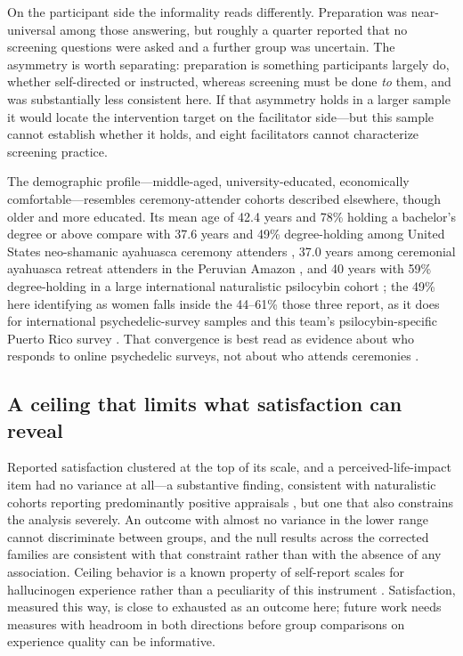 \documentclass[12pt]{article}
\begin{document}
On the participant side the informality reads differently. Preparation was near-universal among those
answering, but roughly a quarter reported that no screening questions were asked and a further group was
uncertain. The asymmetry is worth separating: preparation is something participants largely do, whether
self-directed or instructed, whereas screening must be done \emph{to} them, and was substantially less
consistent here. If that asymmetry holds in a larger sample it would locate the intervention target on the
facilitator side---but this sample cannot establish whether it holds, and eight facilitators cannot
characterize screening practice.

The demographic profile---middle-aged, university-educated, economically comfortable---resembles
ceremony-attender cohorts described elsewhere, though older and more educated. Its mean age of 42.4 years
and 78\% holding a bachelor's degree or above compare with 37.6 years and 49\%
degree-holding among United States neo-shamanic ayahuasca ceremony attenders \citep{pagni2025longterm},
37.0 years among ceremonial ayahuasca retreat attenders in the Peruvian Amazon
\citep{ruffell2021ceremonial}, and 40 years with 59\% degree-holding in a large international naturalistic
psilocybin cohort \citep{nayak2023naturalistic}; the 49\% here identifying as women falls inside the
44--61\% those three report, as it does for international psychedelic-survey samples
\citep{kopra2023investigation,robinson2026field} and this team's psilocybin-specific Puerto Rico survey
\citep{velezrodriguez2026psilocybin}. That convergence is best read as evidence about who responds to online
psychedelic surveys, not about who attends ceremonies \citep{bethlehem2010selection}.

\subsection{A ceiling that limits what satisfaction can reveal}

Reported satisfaction clustered at the top of its scale, and a perceived-life-impact item had no variance at
all---a substantive finding, consistent with naturalistic cohorts reporting predominantly positive
appraisals \citep{nayak2023naturalistic,ruffell2021ceremonial}, but one that also constrains the analysis
severely. An
outcome with almost no variance in the lower range cannot discriminate between groups, and the null results
across the corrected families are consistent with that constraint rather than with the absence of any
association. Ceiling behavior is a known property of self-report scales for hallucinogen experience rather
than a peculiarity of this instrument \citep{bouso2016measuring}. Satisfaction, measured this way, is close
to exhausted as an outcome here; future work needs measures with headroom in both directions before group
comparisons on experience quality can be informative.
\end{document}
